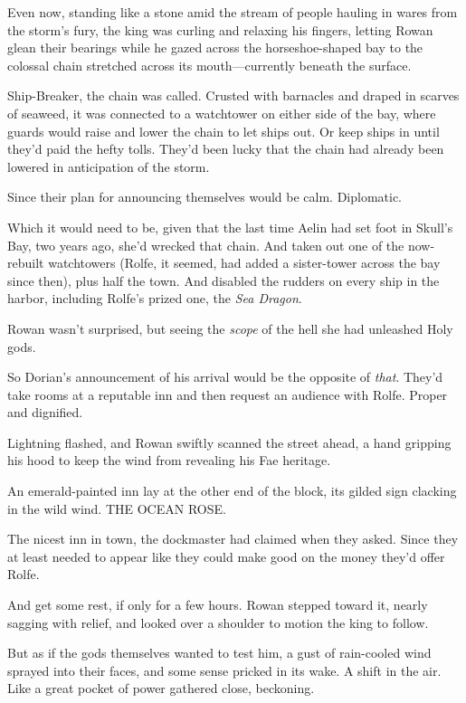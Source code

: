 Even now, standing like a stone amid the stream of people hauling in wares from the storm's fury, the king was curling and relaxing his fingers, letting Rowan glean their bearings while he gazed across the horseshoe-shaped bay to the colossal chain stretched across its mouth---currently beneath the surface.

Ship-Breaker, the chain was called. Crusted with barnacles and draped in scarves of seaweed, it was connected to a watchtower on either side of the bay, where guards would raise and lower the chain to let ships out. Or keep ships in until they'd paid the hefty tolls. They'd been lucky that the chain had already been lowered in anticipation of the storm.

Since their plan for announcing themselves would be  calm. Diplomatic.

Which it would need to be, given that the last time Aelin had set foot in Skull's Bay, two years ago, she'd wrecked that chain. And taken out one of the now-rebuilt watchtowers (Rolfe, it seemed, had added a sister-tower across the bay since then), plus half the town. And disabled the rudders on every ship in the harbor, including Rolfe's prized one, the \emph{Sea Dragon}.

Rowan wasn't surprised, but seeing the \emph{scope} of the hell she had unleashed  Holy gods.

So Dorian's announcement of his arrival would be the opposite of
\emph{that}. They'd take rooms at a reputable inn and then request an audience with Rolfe. Proper and dignified.

Lightning flashed, and Rowan swiftly scanned the street ahead, a hand gripping his hood to keep the wind from revealing his Fae heritage.

An emerald-painted inn lay at the other end of the block, its gilded sign clacking in the wild wind. THE OCEAN ROSE.

The nicest inn in town, the dockmaster had claimed when they asked. Since they at least needed to appear like they could make good on the money they'd offer Rolfe.

And get some rest, if only for a few hours. Rowan stepped toward it, nearly sagging with relief, and looked over a shoulder to motion the king to follow.

But as if the gods themselves wanted to test him, a gust of rain-cooled wind sprayed into their faces, and some sense pricked in its wake. A shift in the air. Like a great pocket of power gathered close, beckoning.

